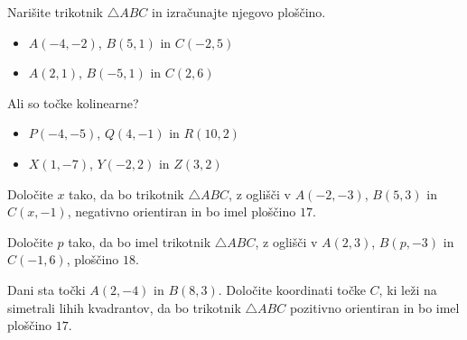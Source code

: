         \begin{naloga}
            Narišite trikotnik $\triangle ABC$ in izračunajte njegovo ploščino.
            \begin{itemize}
                \item $A(-4,-2)$, $B(5,1)$ in $C(-2,5)$ 
                \item $A(2,1)$, $B(-5,1)$ in $C(2,6)$ 
            \end{itemize}
        \end{naloga}

        \begin{naloga}
            Ali so točke kolinearne?
            \begin{itemize}
                \item $P(-4,-5)$, $Q(4,-1)$ in $R(10,2)$ 
                \item $X(1,-7)$, $Y(-2,2)$ in $Z(3,2)$ 
            \end{itemize}
        \end{naloga}

        \begin{naloga}
            Določite $x$ tako, da bo trikotnik $\triangle ABC$, z oglišči v $A(-2,-3)$, $B(5,3)$ in $C(x,-1)$, negativno orientiran 
            in bo imel ploščino $17$. 
        \end{naloga}
       
        \begin{naloga}
            Določite $p$ tako, da bo imel trikotnik $\triangle ABC$, z oglišči v $A(2,3)$, $B(p,-3)$ in $C(-1,6)$, ploščino $18$. 
        \end{naloga}

        \begin{naloga}
            Dani sta točki $A(2,-4)$ in $B(8,3)$. Določite koordinati točke $C$, ki leži na simetrali lihih kvadrantov, 
            da bo trikotnik $\triangle ABC$ pozitivno orientiran in bo imel ploščino $17$.
        \end{naloga}


